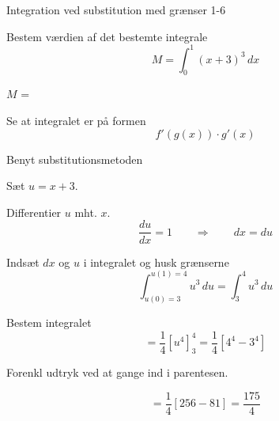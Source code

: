 \documentclass{article}
\begin{document}
\begin{exercise}{Integration ved substitution med grænser 1-6}
	
	
	Bestem værdien af det bestemte integrale
	\[
	M = \int_0^1 (x+3)^3 \, dx
	\]
	
	$M$ =  
	
	
	
	\hint
	
	Se at integralet er på formen
	\[
	f'(g(x)) \cdot g'(x)
	\]
	
	\hint
	
	Benyt substitutionsmetoden
	
	\hint
	
	Sæt $u=x+3$.
	
	
	\hint
	
	Differentier $u$ mht. $x$.
	\[
	\frac{du}{dx} = 1 \qquad	\Rightarrow \qquad dx = du
	\]
	
	\hint
	
	Indsæt $dx$ og $u$ i integralet og husk grænserne
	\[
	\int_{u(0)=3}^{u(1)=4} u^3  \, du = 	\int_{3}^{4} u^3 \, du
	\]
	
	\hint
	
	Bestem integralet
	\[
	= \frac{1}{4} \left[ u^4 \right] _3^4 = \frac{1}{4} \left[ 4^4-3^4  \right]
	\]
	
	\hint
	Forenkl udtryk ved at gange ind i parentesen.
	
	\hint
	
	\[
	=  \frac{1}{4} \left[ 256-81 \right] = \frac{175}{4}
	\]
	
	
\end{exercise}

\newpage
\end{document}
